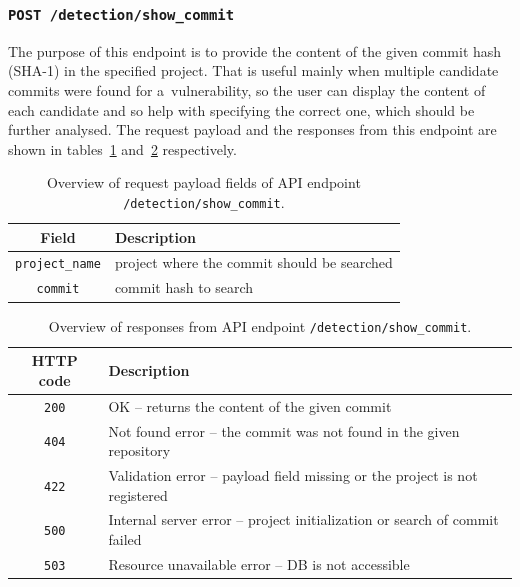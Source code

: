   \subsubsection*{\texttt{POST /detection/show\_commit}}
  The purpose of this endpoint is to provide the content of the given commit hash (SHA-1) in the specified project.
  That is useful mainly when multiple candidate commits were found for a~vulnerability, so the user can
  display the content of each candidate and so help with specifying the correct one, which should be further analysed.
  The request payload and the responses from this endpoint are shown in tables~\ref{tab:detection-show-rq} and~\ref{tab:detection-show-rs}
  respectively.

  \begin{table}[h]
        \centering
        \begin{tabular}{|c|l|}
          \hline
            Field & Description \\
          \hline
            \texttt{project\_name} & project where the commit should be searched \\
            \texttt{commit} & commit hash to search \\
          \hline
        \end{tabular}
        \caption{Overview of request payload fields of API endpoint \texttt{/detection/show\_commit}.}
        \label{tab:detection-show-rq}
    \end{table}

    \begin{table}[h]
        \centering
        \begin{tabular}{|c|l|}
          \hline
            HTTP code & Description \\
          \hline
            \texttt{200} & OK -- returns the content of the given commit \\
            \texttt{404} & Not found error -- the commit was not found in the given repository \\
            \texttt{422} & Validation error -- payload field missing or the project is not registered \\
            \texttt{500} & Internal server error -- project initialization or search of commit failed \\
            \texttt{503} & Resource unavailable error -- DB is not accessible \\
          \hline
        \end{tabular}
        \caption{Overview of responses from API endpoint \texttt{/detection/show\_commit}.}
        \label{tab:detection-show-rs}
    \end{table}

